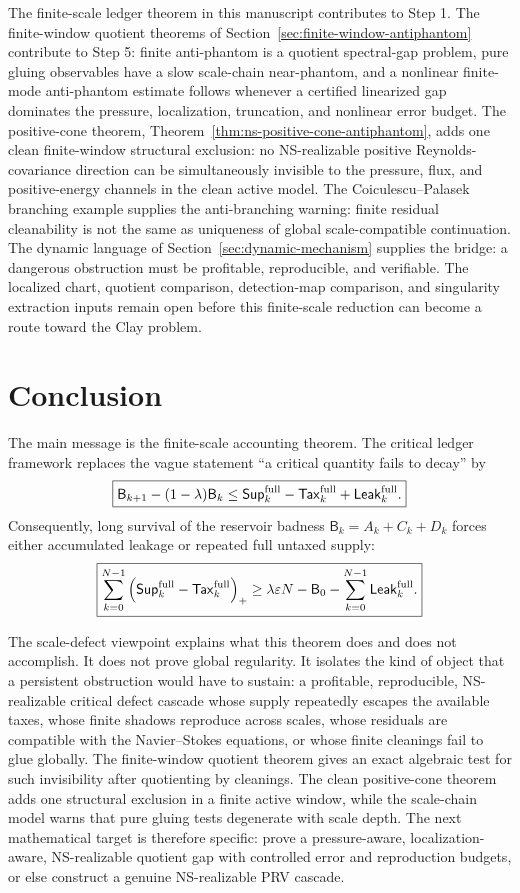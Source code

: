 \documentclass[11pt]{article}
\numberwithin{equation}{section}
\newcommand{\eps}{\varepsilon}
\newcommand{\Supp}{\mathsf{Sup}}
\newcommand{\Tax}{\mathsf{Tax}}
\newcommand{\Leak}{\mathsf{Leak}}
\newcommand{\Bbad}{\mathsf B}
\newcommand{\pos}[1]{\left(#1\right)_+}
\begin{document}
The finite-scale ledger theorem in this manuscript contributes to Step 1.
The finite-window quotient theorems of
Section~\ref{sec:finite-window-antiphantom} contribute to Step 5: finite
anti-phantom is a quotient spectral-gap problem, pure gluing observables
have a slow scale-chain near-phantom, and a nonlinear finite-mode
anti-phantom estimate follows whenever a certified linearized gap dominates
the pressure, localization, truncation, and nonlinear error budget.  The
positive-cone theorem, Theorem~\ref{thm:ns-positive-cone-antiphantom}, adds
one clean finite-window structural exclusion: no NS-realizable positive
Reynolds-covariance direction can be simultaneously invisible to the
pressure, flux, and positive-energy channels in the clean active model.  The
Coiculescu--Palasek branching example supplies the anti-branching warning:
finite residual cleanability is not the same as uniqueness of global
scale-compatible continuation.  The dynamic language of
Section~\ref{sec:dynamic-mechanism} supplies the bridge: a dangerous
obstruction must be profitable, reproducible, and verifiable.  The localized
chart, quotient comparison, detection-map comparison, and singularity
extraction inputs remain open before this finite-scale reduction can become
a route toward the Clay problem.

\section{Conclusion}\label{sec:conclusion}

The main message is the finite-scale accounting theorem.  The critical
ledger framework replaces the vague statement ``a critical quantity fails
to decay'' by
\[
\boxed{
\Bbad_{k+1}-(1-\lambda)\Bbad_k
\le
\Supp_k^{\rm full}-\Tax_k^{\rm full}+\Leak_k^{\rm full}.
}
\]
Consequently, long survival of the reservoir badness
\(\Bbad_k=A_k+C_k+D_k\) forces either accumulated leakage or repeated full
untaxed supply:
\[
\boxed{
\sum_{k=0}^{N-1}\pos{\Supp_k^{\rm full}-\Tax_k^{\rm full}}
\ge
\lambda\eps N-\Bbad_0-
\sum_{k=0}^{N-1}\Leak_k^{\rm full}.
}
\]

The scale-defect viewpoint explains what this theorem does and does not
accomplish.  It does not prove global regularity.  It isolates the kind of
object that a persistent obstruction would have to sustain: a profitable,
reproducible, NS-realizable critical defect cascade whose supply repeatedly
escapes the available taxes, whose finite shadows reproduce across scales,
whose residuals are compatible with the Navier--Stokes equations, or whose
finite cleanings fail to glue globally.  The finite-window quotient theorem
gives an exact algebraic test for such invisibility after quotienting by
cleanings.  The clean positive-cone theorem adds one structural exclusion in
a finite active window, while the scale-chain model warns that pure gluing
tests degenerate with scale depth.  The next mathematical target is therefore
specific: prove a pressure-aware, localization-aware, NS-realizable quotient
gap with controlled error and reproduction budgets, or else construct a
genuine NS-realizable PRV cascade.
\end{document}
